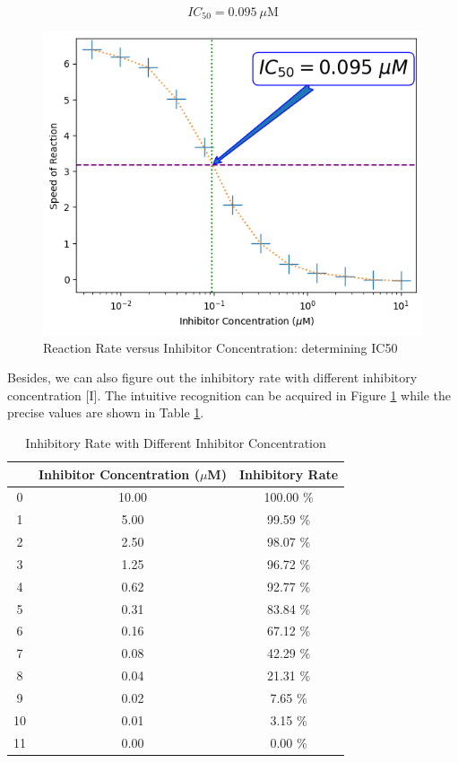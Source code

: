\documentclass{report}
\begin{document}
$$
IC_{50}=0.095\ \mu \text{M}
$$

\begin{figure}
    \centering
    \includegraphics[width=1\linewidth]{../Figures/inhibitor2.png}
    \caption{Reaction Rate versus Inhibitor Concentration: determining IC50}
    \label{Reaction Rate versus Inhibitor Concentration: determining IC50}
\end{figure}

Besides, we can also figure out the inhibitory rate with different inhibitory concentration [I].
The intuitive recognition can be acquired in Figure \ref{Reaction Rate versus Inhibitor Concentration: determining IC50} while the precise values are shown in Table \ref{Inhibitory Rate with Different Inhibitor Concentration}.

\begin{table}
    \centering
    \caption{Inhibitory Rate with Different Inhibitor Concentration}

    \begin{tabular}{|c|c|c|}
        \toprule
         & Inhibitor Concentration ($\mu$M) & Inhibitory Rate \\
        \midrule
        0 & 10.00 & 100.00 \% \\
        1 & 5.00 & 99.59 \% \\
        2 & 2.50 & 98.07 \% \\
        3 & 1.25 & 96.72 \% \\
        4 & 0.62 & 92.77 \% \\
        5 & 0.31 & 83.84 \% \\
        6 & 0.16 & 67.12 \% \\
        7 & 0.08 & 42.29 \% \\
        8 & 0.04 & 21.31 \% \\
        9 & 0.02 & 7.65 \% \\
        10 & 0.01 & 3.15 \% \\
        11 & 0.00 & 0.00 \% \\
        \bottomrule
        \end{tabular}
    \label{Inhibitory Rate with Different Inhibitor Concentration}            
        
\end{table}



\end{document}
